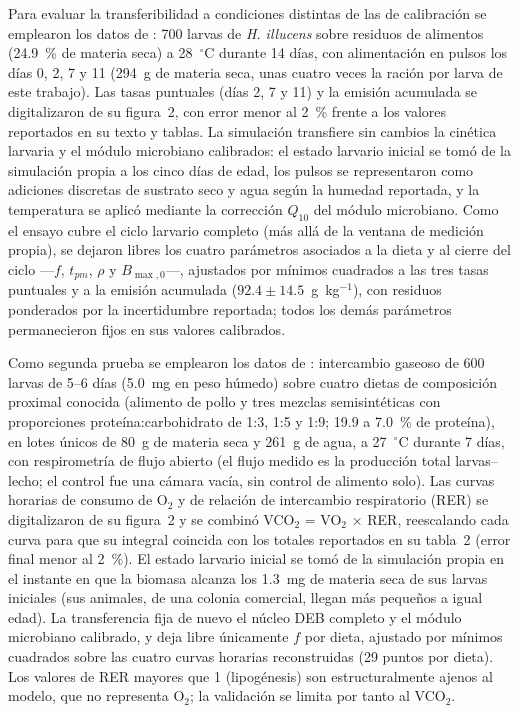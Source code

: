\documentclass[11pt,a4paper]{article}
\begin{document}
Para evaluar la transferibilidad a condiciones distintas de las de calibración se emplearon los datos de \textcite{ermolaevGreenhouseGasEmissions2019}: 700 larvas de \textit{H. illucens} sobre residuos de alimentos (24.9~\% de materia seca) a 28~$^{\circ}$C durante 14 días, con alimentación en pulsos los días 0, 2, 7 y 11 (294~g de materia seca, unas cuatro veces la ración por larva de este trabajo). Las tasas puntuales (días 2, 7 y 11) y la emisión acumulada se digitalizaron de su figura~2, con error menor al 2~\% frente a los valores reportados en su texto y tablas. La simulación transfiere sin cambios la cinética larvaria y el módulo microbiano calibrados: el estado larvario inicial se tomó de la simulación propia a los cinco días de edad, los pulsos se representaron como adiciones discretas de sustrato seco y agua según la humedad reportada, y la temperatura se aplicó mediante la corrección $Q_{10}$ del módulo microbiano. Como el ensayo cubre el ciclo larvario completo (más allá de la ventana de medición propia), se dejaron libres los cuatro parámetros asociados a la dieta y al cierre del ciclo ---$f$, $t_{pm}$, $\rho$ y $B_{\max,0}$---, ajustados por mínimos cuadrados a las tres tasas puntuales y a la emisión acumulada ($92.4 \pm 14.5$~g~kg$^{-1}$), con residuos ponderados por la incertidumbre reportada; todos los demás parámetros permanecieron fijos en sus valores calibrados.

Como segunda prueba se emplearon los datos de \textcite{schonUsingGasExchange2026}: intercambio gaseoso de 600 larvas de 5--6 días (5.0~mg en peso húmedo) sobre cuatro dietas de composición proximal conocida (alimento de pollo y tres mezclas semisintéticas con proporciones proteína:carbohidrato de 1:3, 1:5 y 1:9; 19.9 a 7.0~\% de proteína), en lotes únicos de 80~g de materia seca y 261~g de agua, a 27~$^{\circ}$C durante 7 días, con respirometría de flujo abierto (el flujo medido es la producción total larvas--lecho; el control fue una cámara vacía, sin control de alimento solo). Las curvas horarias de consumo de O$_2$ y de relación de intercambio respiratorio (RER) se digitalizaron de su figura~2 y se combinó VCO$_2$ = VO$_2\,\times\,$RER, reescalando cada curva para que su integral coincida con los totales reportados en su tabla~2 (error final menor al 2~\%). El estado larvario inicial se tomó de la simulación propia en el instante en que la biomasa alcanza los 1.3~mg de materia seca de sus larvas iniciales (sus animales, de una colonia comercial, llegan más pequeños a igual edad). La transferencia fija de nuevo el núcleo DEB completo y el módulo microbiano calibrado, y deja libre únicamente $f$ por dieta, ajustado por mínimos cuadrados sobre las cuatro curvas horarias reconstruidas (29 puntos por dieta). Los valores de RER mayores que 1 (lipogénesis) son estructuralmente ajenos al modelo, que no representa O$_2$; la validación se limita por tanto al VCO$_2$.

\printbibliography
\end{document}
